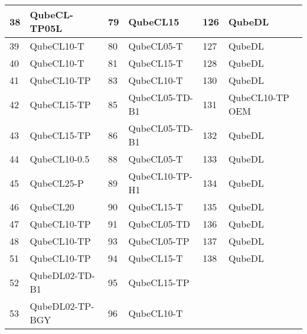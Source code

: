 \begin{table}[!ht]
\begin{tabular}{|l|l||l|l||l|l|}
        38 & QubeCL-TP05L & 79 & QubeCL15 & 126 & QubeDL \\ \hline
        39 & QubeCL10-T & 80 & QubeCL05-T & 127 & QubeDL \\ \hline
        40 & QubeCL10-T & 81 & QubeCL15-T & 128 & QubeDL \\ \hline
        41 & QubeCL10-TP & 83 & QubeCL10-T & 130 & QubeDL \\ \hline
        42 & QubeCL15-TP & 85 & QubeCL05-TD-B1 & 131 & QubeCL10-TP OEM \\ \hline
        43 & QubeCL15-TP & 86 & QubeCL05-TD-B1 & 132 & QubeDL \\ \hline
        44 & QubeCL10-0.5 & 88 & QubeCL05-T & 133 & QubeDL \\ \hline
        45 & QubeCL25-P & 89 & QubeCL10-TP-H1 & 134 & QubeDL \\ \hline
        46 & QubeCL20 & 90 & QubeCL15-T & 135 & QubeDL \\ \hline
        47 & QubeCL10-TP & 91 & QubeCL05-TD & 136 & QubeDL \\ \hline
        48 & QubeCL10-TP & 93 & QubeCL05-TP & 137 & QubeDL \\ \hline
        51 & QubeCL10-TP & 94 & QubeCL15-T & 138 & QubeDL \\ \hline
        52 & QubeDL02-TD-B1 & 95 & QubeCL15-TP & ~ & ~ \\ \hline
        53 & QubeDL02-TP-BGY & 96 & QubeCL10-T & ~ & ~ \\ \hline
    \end{tabular}
\end{table}
\fi